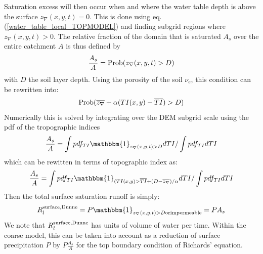 \documentclass[twoside,10pt]{report}
\begin{document}
Saturation excess will then occur when and where the water table depth is above the surface $z_{\nabla}(x,y,t)=0$. This is done using eq. (\ref{water_table_local_TOPMODEL}) and finding subgrid regions where  $z_{\nabla}(x,y,t)>0$.
The relative fraction of the domain that is saturated $A_s$ over the entire catchment $A$ is thus defined by 
\begin{equation}
    \frac{A_s}{A}={\rm Prob}(z_{\nabla}(x,y,t)>D)
\end{equation}
with $D$ the soil layer depth.
Using the porosity of the soil $\nu_e$, this condition can be rewritten into:
\begin{equation}
    {\rm Prob}(\overline{z_{\nabla}} +  \alpha (TI(x,y)-\overline{TI})>D)
\end{equation}
Numerically this is solved by integrating over the DEM subgrid scale using the pdf of the tropographic indices 
\begin{equation}
   \frac{A_s}{A} =  \int pdf_{TI} \mathbbm{1}_{ z_{\nabla}(x,y,t)>D} dTI /  \int pdf_{TI} dTI
\end{equation}
which can be rewitten in terms of topographic index as:
\begin{equation}
   \frac{A_s}{A} =  \int pdf_{TI} \mathbbm{1}_{   (TI(x,y)>\overline{TI} + (D-\overline{z_{\nabla}})/\alpha } dTI /  \int pdf_{TI} dTI
\end{equation}
Then the total surface saturation runoff is simply:
 \begin{equation}
    R_l^{\rm surface, Dunne} = P \mathbbm{1}_{ z_{\nabla}(x,y,t)>D {\rm or impermeable} } = P A_s
\end{equation}
We note that $R_l^{\rm surface, Dunne}$ has units of volume of water per time. Within the coarse model, this can be taken into account as a reduction of surface precipitation $P$ by $P\frac{A_s}{A}$ for the top boundary condition of Richards' equation.

\end{document}
